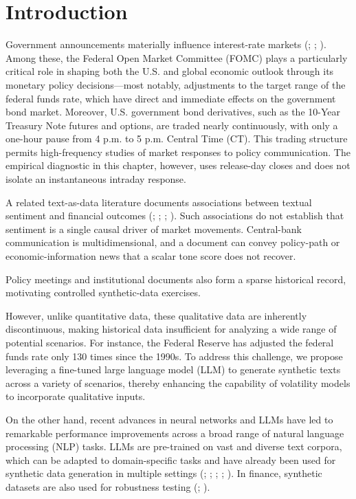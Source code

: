 \section{Introduction}\label{ch2:sec:introduction}


Government announcements materially influence interest-rate markets (\cite{vergote2012}; \cite{rosa2013financial}; \cite{jubinski2013fomc}). Among these, the Federal Open Market Committee (FOMC) plays a particularly critical role in shaping both the U.S. and global economic outlook through its monetary policy decisions—most notably, adjustments to the target range of the federal funds rate, which have direct and immediate effects on the government bond market. Moreover, U.S. government bond derivatives, such as the 10-Year Treasury Note futures and options, are traded nearly continuously, with only a one-hour pause from 4 p.m. to 5 p.m. Central Time (CT). This trading structure permits high-frequency studies of market responses to policy communication. The empirical diagnostic in this chapter, however, uses release-day closes and does not isolate an instantaneous intraday response.


A related text-as-data literature documents associations between textual
sentiment and financial outcomes (\cite{bollen2011twitter}; \cite{ding2015deep}; \cite{ding2016knowledge}; \cite{xu2018stock}). Such associations do not establish that sentiment is a single causal driver of market movements. Central-bank communication is multidimensional, and a document can convey policy-path or economic-information news that a scalar tone score does not recover.


Policy meetings and institutional documents also form a sparse historical record, motivating controlled synthetic-data exercises. 


However, unlike quantitative data, these qualitative data are inherently discontinuous, making historical data insufficient for analyzing a wide range of potential scenarios. For instance, the Federal Reserve has adjusted the federal funds rate only 130 times since the 1990s. To address this challenge, we propose leveraging a fine-tuned large language model (LLM) to generate synthetic texts across a variety of scenarios, thereby enhancing the capability of volatility models to incorporate qualitative inputs.



On the other hand, recent advances in neural networks and LLMs have led to remarkable performance improvements across a broad range of natural language processing (NLP) tasks. LLMs are pre-trained on vast and diverse text corpora, which can be adapted to domain-specific tasks and have already been used for synthetic data generation in multiple settings (\cite{schick2021generating}; \cite{peng2023instruction}; \cite{yu2024large}; \cite{li2021synthetic}; \cite{meoni2024generating}). In finance, synthetic datasets are also used for robustness testing (\cite{cao2022synthetic}; \cite{carvajal2022synthetic}).



